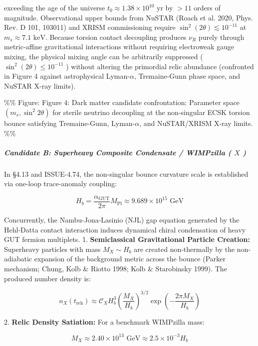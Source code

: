 \documentclass[11pt,a4paper]{article}
\theoremstyle{definition}\newtheorem{definition}{Definition}
\theoremstyle{remark}\newtheorem{remark}{Remark}
\begin{document}
exceeding the age of the universe $t_0 \approx 1.38 \times 10^{10}\text{ yr}$ by $> 11$ orders of magnitude. Observational upper bounds from NuSTAR (Roach et al. 2020, Phys. Rev. D 101, 103011) and XRISM commissioning require $\sin^2(2\theta) \lesssim 10^{-11}$ at $m_s \approx 7.1\text{ keV}$. Because torsion contact decoupling produces $\nu_R$ purely through metric-affine gravitational interactions without requiring electroweak gauge mixing, the physical mixing angle can be arbitrarily suppressed ( $\sin^2(2\theta) \le 10^{-11}$ ) without altering the primordial relic abundance (confronted in Figure 4 against astrophysical Lyman-$\alpha$, Tremaine-Gunn phase space, and NuSTAR X-ray limits).

\%\% Figure: Figure 4: Dark matter candidate confrontation: Parameter space $(m_s, \sin^2 2\theta)$ for sterile neutrino decoupling at the non-singular ECSK torsion bounce satisfying Tremaine-Gunn, Lyman-$\alpha$, and NuSTAR/XRISM X-ray limits. \%\%
\subparagraph{Candidate B: Superheavy Composite Condensate / WIMPzilla ( $X$ )}

In §4.13 and ISSUE-4.74, the non-singular bounce curvature scale is established via one-loop trace-anomaly coupling:


\begin{equation}
H_b = \frac{\alpha_{\text{GUT}}}{2\pi} M_{\text{Pl}} \approx 9.689 \times 10^{15}\text{ GeV}
\end{equation}


Concurrently, the Nambu-Jona-Lasinio (NJL) gap equation generated by the Hehl-Datta contact interaction induces dynamical chiral condensation of heavy GUT fermion multiplets.
1. \textbf{Semiclassical Gravitational Particle Creation:} Superheavy particles with mass $M_X \sim H_b$ are created non-thermally by the non-adiabatic expansion of the background metric across the bounce (Parker mechanism; Chung, Kolb \& Riotto 1998; Kolb \& Starobinsky 1999). The produced number density is:


\begin{equation}
n_X(t_{\text{reh}}) \approx \mathcal{C}_X H_b^3 \left( \frac{M_X}{H_b} \right)^{3/2} \exp\left( - \frac{2\pi M_X}{H_b} \right)
\end{equation}


2. \textbf{Relic Density Satiation:} For a benchmark WIMPzilla mass:


\begin{equation}
M_X \approx 2.40 \times 10^{13}\text{ GeV} \approx 2.5 \times 10^{-3} H_b
\end{equation}
\end{document}
